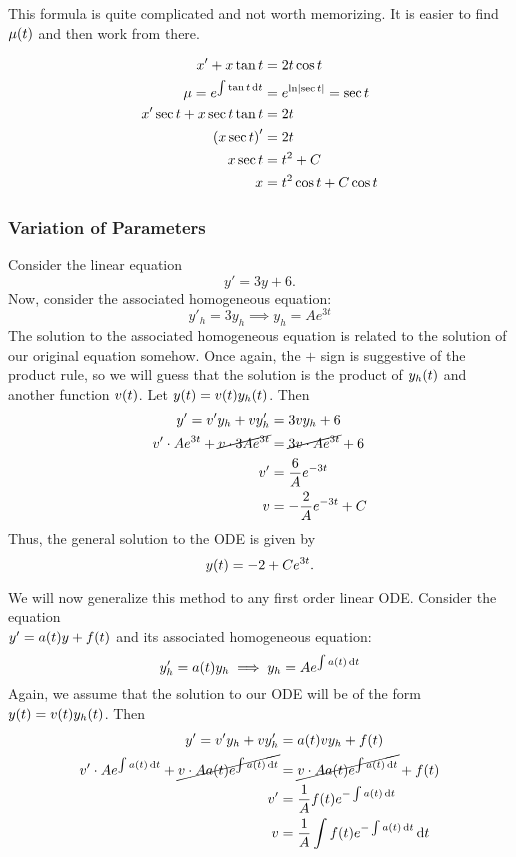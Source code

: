 This formula is quite complicated and not worth memorizing. It is easier to find $\mu\p{t}$ and then work from there.
\par\bigskip
\begin{example}
	\noskip
	\begin{align*}
		x' + x\tan{t} &= 2t\cos{t} \\
		\mu = e^{\int \tan{t} \, \diff{t}} &= e^{\ln\abs{\sec{t}}} = \sec{t} \\
		x'\sec{t} + x\sec{t}\tan{t} &= 2t \\
		\p{x\sec{t}}' &= 2t \\
		x\sec{t} &= t^2 + C \\
		x &= t^2\cos{t} + C\cos{t}
	\end{align*}
\end{example}

\subsubsection{Variation of Parameters}
\normalskip
Consider the linear equation \[ y' = 3y + 6. \] Now, consider the associated homogeneous equation: \[ y'_h = 3y_h \implies y_h = Ae^{3t} \] The solution to the associated homogeneous equation is related to the solution of our original equation somehow. Once again, the $+$ sign is suggestive of the product rule, so we will guess that the solution is the product of $y_h\p{t}$ and another function $v\p{t}$. Let $y\p{t} = v\p{t}y_h\p{t}$. Then
\begin{align*}
	y' = v'y_h + vy'_h &= 3vy_h + 6 \\
	v' \cdot Ae^{3t} + \cancel{v \cdot 3Ae^{3t}} &= \cancel{3v \cdot Ae^{3t}} + 6 \\
	v' &= \frac{6}{A}e^{-3t} \\
	v &= -\frac{2}{A}e^{-3t} + C
\end{align*}
Thus, the general solution to the ODE is given by \[ y\p{t} = -2 + Ce^{3t}. \]
\par
We will now generalize this method to any first order linear ODE. Consider the equation \\ $y' = a\p{t}y + f\p{t}$ and its associated homogeneous equation: \[ y'_h = a\p{t}y_h \implies y_h = Ae^{\int a\p{t} \, \diff{t}} \]
Again, we assume that the solution to our ODE will be of the form $y\p{t} = v\p{t}y_h\p{t}$. Then
\begin{align*}
	y' = v'y_h + vy'_h &= a\p{t}vy_h + f\p{t} \\
	v' \cdot Ae^{\int a\p{t} \, \diff{t}} + \cancel{v \cdot Aa\p{t}e^{\int a\p{t} \, \diff{t}}} &= \cancel{v \cdot Aa\p{t}e^{\int a\p{t} \, \diff{t}}} + f\p{t} \\
	v' &= \frac{1}{A}f\p{t}e^{-\int a\p{t} \, \diff{t}} \\
	v &= \frac{1}{A} \int f\p{t}e^{-\int a\p{t} \, \diff{t}} \, \diff{t}
\end{align*}

